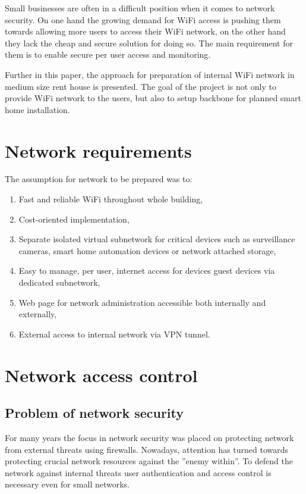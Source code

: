 \documentclass{llncs}
\begin{document}
Small businesses are often in a difficult position when it comes to network
security. On one hand the growing demand for WiFi access is pushing them
towards allowing more users to access their WiFi network, on the other hand they
lack the cheap and secure solution for doing so. The main requirement for them is
to enable secure per user access and monitoring. 

Further in this paper, the approach for preparation of internal WiFi network in
medium size rent house is presented. The goal of the project is not only to
provide WiFi network to the users, but also to setup backbone for planned
smart home installation.

\section{Network requirements}

The assumption for network to be prepared was to:
\begin{enumerate}
  \item Fast and reliable WiFi throughout whole building,
  \item Cost-oriented implementation,
  \item Separate isolated virtual subnetwork for critical devices
such as surveillance cameras, smart home automation devices or network attached
storage,
  \item Easy to manage, per user, internet access for devices guest devices via
  dedicated subnetwork,
  \item Web page for network administration accessible both internally and
  externally,
  \item External access to internal network via VPN tunnel.
\end{enumerate}


\section{Network access control}

\subsection{Problem of network security}
For many years the focus in network security was placed on protecting
network from external threats using firewalls. Nowadays, attention has turned
towards protecting crucial network resources against the ''enemy within''. To
defend the network against internal threats user authentication and
access control is necessary even for small networks. 
\end{document}
